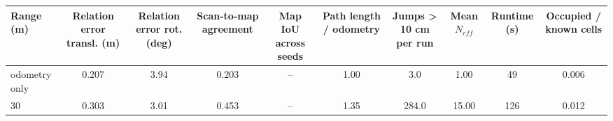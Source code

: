 \begin{tabular}{lccccccccc}
\toprule
Range (m) & Relation error transl. (m) & Relation error rot. (deg) & Scan-to-map agreement & Map IoU across seeds & Path length / odometry & Jumps > 10 cm per run & Mean $N_{eff}$ & Runtime (s) & Occupied / known cells \\
\midrule
odometry only & 0.207 & 3.94 & 0.203 & -- & 1.00 & 3.0 & 1.00 & 49 & 0.006 \\
30 & 0.303 & 3.01 & 0.453 & -- & 1.35 & 284.0 & 15.00 & 126 & 0.012 \\
\bottomrule
\end{tabular}

